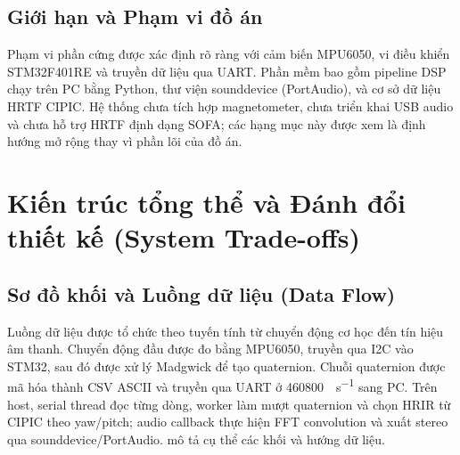 \section{Giới hạn và Phạm vi đồ án}
Phạm vi phần cứng được xác định rõ ràng với cảm biến MPU6050, vi điều khiển STM32F401RE và truyền dữ liệu qua UART. Phần mềm bao gồm pipeline DSP chạy trên PC bằng Python, thư viện sounddevice (PortAudio), và cơ sở dữ liệu HRTF CIPIC. Hệ thống chưa tích hợp magnetometer, chưa triển khai USB audio và chưa hỗ trợ HRTF định dạng SOFA; các hạng mục này được xem là định hướng mở rộng thay vì phần lõi của đồ án.

\chapter{Kiến trúc tổng thể và Đánh đổi thiết kế (System Trade-offs)}

\section{Sơ đồ khối và Luồng dữ liệu (Data Flow)}
Luồng dữ liệu được tổ chức theo tuyến tính từ chuyển động cơ học đến tín hiệu âm thanh. Chuyển động đầu được đo bằng MPU6050, truyền qua I2C vào STM32, sau đó được xử lý Madgwick để tạo quaternion. Chuỗi quaternion được mã hóa thành CSV ASCII và truyền qua UART ở \SI{460800}{\bit\per\second} sang PC. Trên host, serial thread đọc từng dòng, worker làm mượt quaternion và chọn HRIR từ CIPIC theo yaw/pitch; audio callback thực hiện FFT convolution và xuất stereo qua sounddevice/PortAudio.  mô tả cụ thể các khối và hướng dữ liệu.

